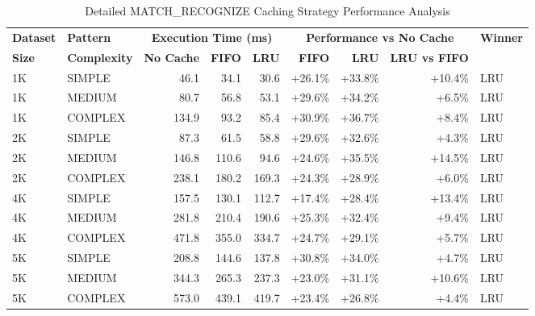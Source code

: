 \documentclass{article}
\begin{document}
\begin{table}[htbp]
\centering
\caption{Detailed MATCH\_RECOGNIZE Caching Strategy Performance Analysis}
\label{tab:detailed_performance}
\begin{tabular}{|l|l|r|r|r|r|r|r|l|}
\hline
\textbf{Dataset} & \textbf{Pattern} & \multicolumn{3}{c|}{\textbf{Execution Time (ms)}} & \multicolumn{3}{c|}{\textbf{Performance vs No Cache}} & \textbf{Winner} \\
\textbf{Size} & \textbf{Complexity} & \textbf{No Cache} & \textbf{FIFO} & \textbf{LRU} & \textbf{FIFO} & \textbf{LRU} & \textbf{LRU vs FIFO} & \\
\hline
1K & SIMPLE & 46.1 & 34.1 & 30.6 & +26.1\% & +33.8\% & +10.4\% & LRU \\
1K & MEDIUM & 80.7 & 56.8 & 53.1 & +29.6\% & +34.2\% & +6.5\% & LRU \\
1K & COMPLEX & 134.9 & 93.2 & 85.4 & +30.9\% & +36.7\% & +8.4\% & LRU \\
2K & SIMPLE & 87.3 & 61.5 & 58.8 & +29.6\% & +32.6\% & +4.3\% & LRU \\
2K & MEDIUM & 146.8 & 110.6 & 94.6 & +24.6\% & +35.5\% & +14.5\% & LRU \\
2K & COMPLEX & 238.1 & 180.2 & 169.3 & +24.3\% & +28.9\% & +6.0\% & LRU \\
4K & SIMPLE & 157.5 & 130.1 & 112.7 & +17.4\% & +28.4\% & +13.4\% & LRU \\
4K & MEDIUM & 281.8 & 210.4 & 190.6 & +25.3\% & +32.4\% & +9.4\% & LRU \\
4K & COMPLEX & 471.8 & 355.0 & 334.7 & +24.7\% & +29.1\% & +5.7\% & LRU \\
5K & SIMPLE & 208.8 & 144.6 & 137.8 & +30.8\% & +34.0\% & +4.7\% & LRU \\
5K & MEDIUM & 344.3 & 265.3 & 237.3 & +23.0\% & +31.1\% & +10.6\% & LRU \\
5K & COMPLEX & 573.0 & 439.1 & 419.7 & +23.4\% & +26.8\% & +4.4\% & LRU \\
\hline
\end{tabular}
\end{table}
\end{document}
